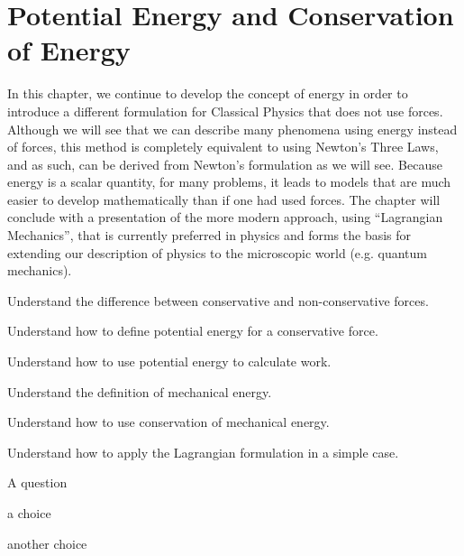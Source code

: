 
\chapter{Potential Energy and Conservation of Energy}
\label{chapter:potentialecons}
In this chapter, we continue to develop the concept of energy in order to introduce a different formulation for Classical Physics that does not use forces. Although we will see that we can describe many phenomena using energy instead of forces, this method is completely equivalent to using Newton's Three Laws, and as such, can be derived from Newton's formulation as we will see. Because energy is a scalar quantity, for many problems, it leads to models that are much easier to develop mathematically than if one had used forces. The chapter will conclude with a presentation of the more modern approach, using ``Lagrangian Mechanics'', that is currently preferred in physics and forms the basis for extending our description of physics to the microscopic world (e.g. quantum mechanics). 

\begin{learningObjectives}{
 \item Understand the difference between conservative and non-conservative forces.
 \item Understand how to define potential energy for a conservative force.
 \item Understand how to use potential energy to calculate work.
 \item Understand the definition of mechanical energy.
 \item Understand how to use conservation of mechanical energy.
 \item Understand how to apply the Lagrangian formulation in a simple case.
 }
\end{learningObjectives}

\begin{opening}
\begin{MCquestion}{A question}
\item a choice
\item another choice %
\end{MCquestion}
\end{opening}

